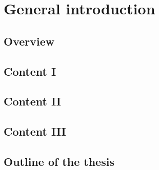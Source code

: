 \chapter{General introduction}

\clearpage
\section{Overview}
\lipsum[1-1] 
\cite{Lakatos1970}

\section{Content I}
\lipsum[1-2]

\section{Content II}
\lipsum[1-3]

\section{Content III}
\lipsum[1-4]

\section{Outline of the thesis}
\lipsum[1-5]

\clearpage
\printbibliography[heading=subbibnumbered, title={References}]